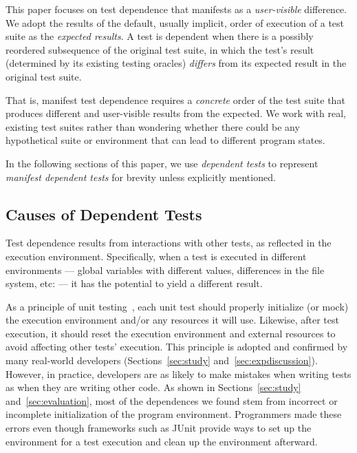 This paper focuses on test
dependence that manifests as a \textit{user-visible}
difference. We adopt the results of the default, usually
implicit, order of execution of a test suite as the
\textit{expected results}. A test is dependent when there is a possibly
reordered subsequence of the original test suite, in which
the test's result (determined by its existing testing
oracles) \textit{differs} from its expected result in the
original test suite.

That is, manifest test dependence
requires a \emph{concrete} order of the test suite that
produces {different} and {user-visible} results from the expected.  
%
We work with real, existing test suites rather than wondering
whether there could be any hypothetical suite 
or environment that can lead to different program states.

In the following sections of this paper, we use \textit{dependent tests}
to represent \textit{manifest dependent tests} for brevity
unless explicitly mentioned.





\subsection{Causes of Dependent Tests}


Test dependence results from interactions with other tests, as reflected
in the execution environment.
Specifically, when a
test is executed in different environments --- global variables
with different values, differences in the file system, etc: --- it has the
potential to yield
a different result.  

As a principle of unit testing~\cite{Massol:2003}, each unit
test should properly initialize (or mock) the execution environment
and/or any resources it will use.
Likewise, after test execution, it should reset the
execution environment and external resources
to avoid affecting other tests' execution.
This principle is adopted and confirmed by many
real-world developers (Sections~\ref{sec:study} and~\ref{sec:expdiscussion}).
%
%
However, in practice,
developers are as likely
to make mistakes when writing tests as when they are writing other code.
As shown in Sections~\ref{sec:study} and~\ref{sec:evaluation}, most of the dependences we found
stem from incorrect or incomplete initialization
of the program environment.
Programmers made these errors even though frameworks such as
JUnit provide ways to set up the environment for a test execution and clean
up the environment afterward.


